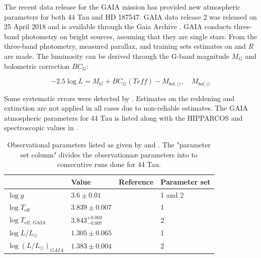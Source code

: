 The recent data release for the GAIA mission has provided new atmospheric parameters for both 44 Tau and HD 187547. GAIA data release 2 was released on 25 April 2018 and is available through the Gaia Archive \citep{brown2018gaia}. GAIA conducts three-band photometry on bright sources, assuming that they are single stars. From the three-band photometry, measured parallax, and training sets estimates on \teff and $R$ are made. 
The luminosity can be derived through the G-band magnitude $M_G$ and bolometric correction $BC_G$:

\begin{equation}
	-2.5\log L = M_G + BC_G(Teff) - M_{bol,\odot}, \quad M_{bol,\odot}
\end{equation}

Some systematic errors were detected by \citet{andrae2018gaia}. Estimates on the reddening and extinction are not applied in all cases due to non-reliable estimates. The GAIA atmospheric parameters for 44 Tau is listed along with the HIPPARCOS and spectroscopic values in . 

\begin{table}[htbp]
	\caption{Observational parameters listed as given by \citet{lenz2010delta} and \citet{brown2018gaia}. The "parameter set column" divides the observationaæ parameters into to consecutive runs done for 44 Tau.}
	\label{obsparams}
\centering
\begin{tabular}{|l|lll|}
\hline
                                                   & Value                                             & Reference  & Parameter set\\ \hline
$\log g$                                  &  $3.6 \pm 0.01$                            & \citep{zima2007high} & 1 and 2   \\
$\log T_\text{eff}$             & $3.839  \pm 0.007$                   &   \citep{lenz2010delta}  & 1 \\
$\log T_\text{eff, GAIA}$ &  $3.843^{+0.003}_{-0.007}$ & \citep{brown2018gaia} & 2\\
$\log L/L_\odot$                  &  $1.305 \pm 0.065$                          & \citep{lenz2010delta}  & 1   \\
$\log (L/L_\odot)_{GAIA}$& $1.383 \pm 0.004$                        &  \citep{brown2018gaia}  & 2 \\ \hline
\end{tabular}
\end{table}

